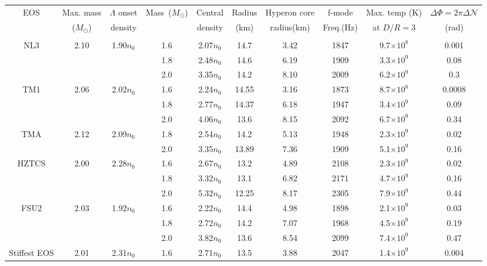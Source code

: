 \documentclass[%
 reprint,
 amsmath,amssymb,
 aps,
]{revtex4-2}
\begin{document}
\begin{table}
\begin{adjustwidth}{-3em}{}
\begin{center}
    \begin{tabular}{|c|c|c|c|c|c|c|c|c|c|}
    \hline
    EOS & Max. mass & $\Lambda$ onset & Mass~($M_{\odot}$) & Central  & Radius & Hyperon core& f-mode  & Max. temp (K)  & $\Delta \Phi = 2\pi \Delta\mathcal{N}$  \\ 
    & ($M_{\odot}$) & density & & density & (km) &  radius(km) & Freq.(Hz) &  at $D/R = 3$ & (rad) \\
    \hline
    \multicolumn{10}{c}{} \\
    \hline
    NL3 & 2.10 & 1.90$n_0$ & 1.6 & 2.07$n_0$ & 14.7 & 3.42 & 1847 & 9.7$\times 10^8$ & 0.001 \\
    ~\cite{Chen2014}& & & 1.8 & 2.48$n_0$ & 14.6 & 6.19 & 1909 & 3.3$\times 10^9$ & 0.08 \\
    & & & 2.0 & 3.35$n_0$ & 14.2 & 8.10 & 2009 & 6.2$\times 10^9$ & 0.3 \\
    \hline
    TM1 & 2.06 & 2.02$n_0$ & 1.6 & 2.24$n_0$ & 14.55 & 3.16 & 1873 & 8.7$\times 10^8$ & 0.0008 \\
    ~\cite{Steiner_2013}& & & 1.8 & 2.77$n_0$ & 14.37 & 6.18 & 1947 & 3.4$\times 10^9$ & 0.09 \\
    & & & 2.0 & 4.06$n_0$ & 13.6 & 8.15 & 2092 & 6.7$\times 10^9$ & 0.34 \\
    \hline
    TMA & 2.12 & 2.09$n_0$ & 1.8 & 2.54$n_0$ & 14.2 & 5.13 & 1948 & 2.3$\times 10^9$ & 0.02 \\
    ~\cite{Steiner_2013}& & & 2.0 & 3.35$n_0$ & 13.89 & 7.36 & 1909 & 5.1$\times 10^9$ & 0.16\\
    \hline
    HZTCS & 2.00 & 2.28$n_0$ & 1.6 & 2.67$n_0$ & 13.2 & 4.89 & 2108 & 2.3$\times 10^9$ & 0.02 \\
    ~\cite{HZTCS}& & & 1.8 & 3.32$n_0$ & 13.1 & 6.82 & 2171 & 4.7$\times 10^9$ & 0.16 \\
    & & & 2.0 & 5.32$n_0$ & 12.25 & 8.17 & 2305 & 7.9$\times 10^9$ & 0.44 \\
    \hline
    FSU2 & 2.03 & 1.92$n_0$ & 1.6 & 2.22$n_0$ & 14.4 & 4.98 & 1898 & 2.1$\times 10^9$ & 0.03 \\
    ~\cite{Chen2014}& & & 1.8 & 2.72$n_0$ & 14.2 & 7.07 & 1968 & 4.5$\times 10^9$ & 0.19 \\
    & & & 2.0 & 3.82$n_0$ & 13.6 & 8.54 & 2099 & 7.4$\times 10^9$ & 0.47 \\
    \hline 
    Stiffest EOS & 2.01 & 2.31$n_0$ & 1.6 & 2.71$n_0$ & 13.5 & 3.88 & 2047 & 1.4$\times 10^9$ & 0.004 \\

\end{tabular}
\end{center}
\end{adjustwidth}
\end{table}
\end{document}

